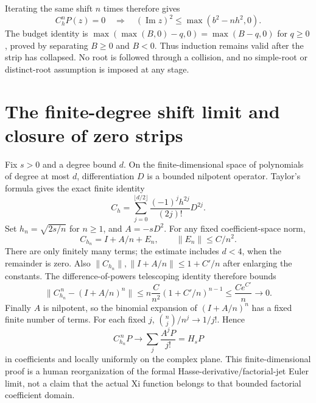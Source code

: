 \documentclass[11pt]{article}
\begin{document}
Iterating the same shift $n$ times therefore gives
\begin{equation}\label{eq:iterstrip}
 C_h^nP(z)=0\quad\Longrightarrow\quad
       (\operatorname{Im}z)^2\le\max(b^2-nh^2,0).
\end{equation}
The budget identity is
$\max(\max(B,0)-q,0)=\max(B-q,0)$ for $q\ge0$, proved by separating
$B\ge0$ and $B<0$. Thus induction remains valid after the strip has
collapsed. No root is followed through a collision, and no simple-root
or distinct-root assumption is imposed at any stage.

\section{The finite-degree shift limit and closure of zero strips}
Fix $s>0$ and a degree bound $d$. On the finite-dimensional space of
polynomials of degree at most $d$, differentiation $D$ is a bounded
nilpotent operator. Taylor's formula gives the exact finite identity
\[
 C_h=\sum_{j=0}^{\lfloor d/2\rfloor}\frac{(-1)^jh^{2j}}{(2j)!}D^{2j}.
\]
Set $h_n=\sqrt{2s/n}$ for $n\ge1$, and $A=-sD^2$. For any fixed
coefficient-space norm,
\[
 C_{h_n}=I+A/n+E_n,\qquad \|E_n\|\le C/n^2.
\]
There are only finitely many terms; the estimate includes $d<4$, when
the remainder is zero. Also $\|C_{h_n}\|,\|I+A/n\|\le1+C'/n$ after
enlarging the constants. The difference-of-powers telescoping identity
therefore bounds
\[
 \|C_{h_n}^{\,n}-(I+A/n)^n\|
 \le n\frac{C}{n^2}(1+C'/n)^{n-1}\le\frac{Ce^{C'}}n\longrightarrow0.
\]
Finally $A$ is nilpotent, so the binomial expansion of $(I+A/n)^n$
has a fixed finite number of terms. For each fixed $j$,
$\binom nj/n^j\to1/j!$. Hence
\begin{equation}\label{eq:shiftlimit}
 C_{h_n}^{\,n}P\longrightarrow\sum_j\frac{A^jP}{j!}=H_sP
\end{equation}
in coefficients and locally uniformly on the complex plane. This
finite-dimensional proof is a human reorganization of the formal
Hasse-derivative/factorial-jet Euler limit, not a claim that the actual
Xi function belongs to that bounded factorial coefficient domain.
\end{document}
